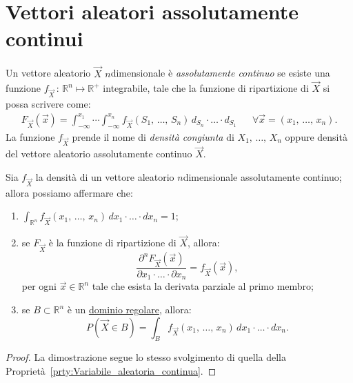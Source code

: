     \section{Vettori aleatori assolutamente continui}
        \begin{defn}\label{defn:Vettori_aleatori_assolutamente_continui}
            Un vettore aleatorio $\vec{X}$ $n$\nbdash dimensionale è \emph{assolutamente continuo} se esiste una funzione $f_{\vec{X}}\,:\, \mathbb{R}^n \mapsto \mathbb{R}^+$ integrabile, tale che la funzione di ripartizione di $\vec{X}$ si possa scrivere come:
            \begin{align*}
                F_{\vec{X}}(\vec{x}) = \int_{-\infty}^{x_1} \dotsi 
                \int_{-\infty}^{x_n} f_{\vec{X}}(S_1,\, \ldots,\, S_{n})\, d_{S_n} \cdot \ldots \cdot d_{S_1} 
                & & \forall \vec{x} = (x_1,\, \ldots,\, x_{n})
            .\end{align*}
            La funzione $f_{\vec{X}}$ prende il nome di \emph{densità congiunta} di $X_1,\, \ldots,\, X_{n}$ oppure densità del vettore aleatorio assolutamente continuo $\vec{X}$.
        \end{defn}
        \begin{prty}\label{prty:Vettori_aleatori_assolutamente_continui}
            Sia $f_{\vec{X}}$ la densità di un vettore aleatorio $n$\nbdash dimensionale assolutamente continuo; allora possiamo affermare che:
            \begin{enumerate}
                \item $\int_{\mathbb{R}^n} f_{\vec{X}}(x_1,\, \ldots,\, x_{n})\, dx_1 \cdot \ldots \cdot dx_n = 1$;
                \item se  $F_{\vec{X}}$ è la funzione di ripartizione di $\vec{X}$, allora: \[
                    \frac{\partial^n F_{\vec{X}}(\vec{x})}{\partial x_1 \cdot \ldots \cdot \partial x_{n}} = f_{\vec{X}}(\vec{x})
                ,\] per ogni $\vec{x} \in \mathbb{R}^n$ tale che esista la derivata parziale al primo membro;
                \item se $B \subset \mathbb{R}^n$ è un \underline{dominio regolare}, allora: \[
                        P(\vec{X} \in B) = \int_{B} f_{\vec{X}}(x_1,\, \ldots,\, x_{n})\, dx_1 \cdot \ldots \cdot dx_n
                .\] 
            \end{enumerate}
        \end{prty}
        \begin{proof}
            La dimostrazione segue lo stesso svolgimento di quella della Proprietà~\ref{prty:Variabile_aleatoria_continua}.
        \end{proof}
